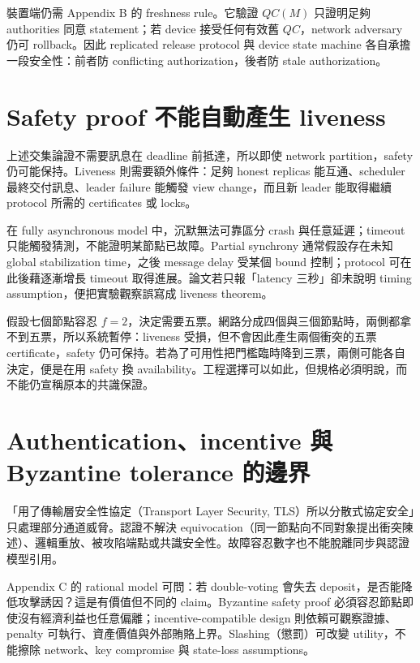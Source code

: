 \documentclass[11pt,a4paper,oneside,openany]{book}
\begin{document}
裝置端仍需 Appendix B 的 freshness rule。它驗證 $QC(M)$ 只證明足夠 authorities 同意 statement；若 device 接受任何有效舊 $QC$，network adversary 仍可 rollback。因此 replicated release protocol 與 device state machine 各自承擔一段安全性：前者防 conflicting authorization，後者防 stale authorization。

\section{Safety proof 不能自動產生 liveness}
上述交集論證不需要訊息在 deadline 前抵達，所以即使 network partition，safety 仍可能保持。Liveness 則需要額外條件：足夠 honest replicas 能互通、scheduler 最終交付訊息、leader failure 能觸發 view change，而且新 leader 能取得繼續 protocol 所需的 certificates 或 locks。

在 fully asynchronous model 中，沉默無法可靠區分 crash 與任意延遲；timeout 只能觸發猜測，不能證明某節點已故障。Partial synchrony 通常假設存在未知 global stabilization time，之後 message delay 受某個 bound 控制；protocol 可在此後藉逐漸增長 timeout 取得進展。論文若只報「latency 三秒」卻未說明 timing assumption，便把實驗觀察誤寫成 liveness theorem。

\begin{example}
假設七個節點容忍 $f=2$，決定需要五票。網路分成四個與三個節點時，兩側都拿不到五票，所以系統暫停：liveness 受損，但不會因此產生兩個衝突的五票 certificate，safety 仍可保持。若為了可用性把門檻臨時降到三票，兩側可能各自決定，便是在用 safety 換 availability。工程選擇可以如此，但規格必須明說，而不能仍宣稱原本的共識保證。
\end{example}

\section{Authentication、incentive 與 Byzantine tolerance 的邊界}
\begin{misconception}
「用了傳輸層安全性協定（Transport Layer Security, TLS）所以分散式協定安全」只處理部分通道威脅。認證不解決 equivocation（同一節點向不同對象提出衝突陳述）、邏輯重放、被攻陷端點或共識安全性。故障容忍數字也不能脫離同步與認證模型引用。
\end{misconception}

Appendix C 的 rational model 可問：若 double-voting 會失去 deposit，是否能降低攻擊誘因？這是有價值但不同的 claim。Byzantine safety proof 必須容忍節點即使沒有經濟利益也任意偏離；incentive-compatible design 則依賴可觀察證據、penalty 可執行、資產價值與外部賄賂上界。Slashing（懲罰）可改變 utility，不能擦除 network、key compromise 與 state-loss assumptions。
\end{document}
